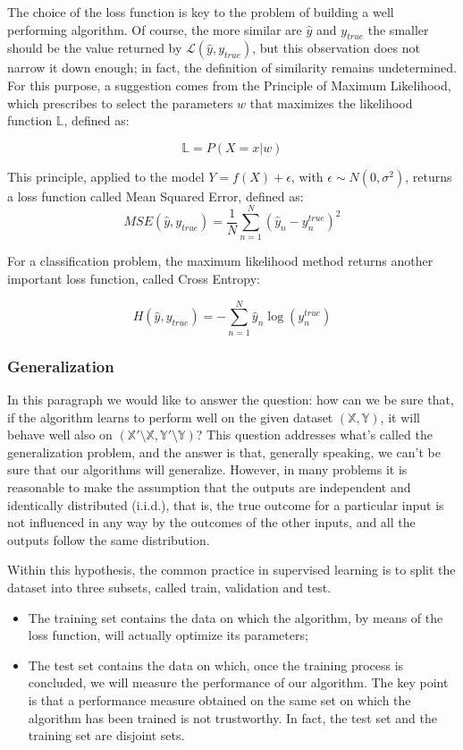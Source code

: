\documentclass[a4paper, twoside]{article}
\begin{document}
         The choice of the loss function is key to the problem of building a well performing algorithm. Of course, the more similar are $\hat{y}$ and $y_{true}$ the smaller should be the value returned by $\mathcal{L}(\hat{y}, y_{true})$, but this observation does not narrow it down enough; in fact, the definition of similarity remains undetermined. For this purpose, a suggestion comes from the Principle of Maximum Likelihood, which prescribes to select the parameters $w$ that maximizes the likelihood function $\mathbb{L}$, defined as:

         $$ \mathbb{L} = P(X=x | w)$$

         This principle, applied to the model $ Y = f(X) + \epsilon$, with $\epsilon \sim N(0, \sigma^2)$, returns a loss function called Mean Squared Error, defined as:
         $$ MSE(\hat{y}, y_{true}) = \frac{1}{N} \sum_{n=1}^{N} (\hat{y}_n - y^{true}_n)^{2}$$

         For a classification problem, the maximum likelihood method returns another important loss function, called Cross Entropy:

         $$ H(\hat{y}, y_{true}) = - \sum_{n=1}^{N} \hat{y}_n \log(y^{true}_n)$$

        \subsubsection{Generalization}

        In this paragraph we would like to answer the question: how can we be sure that, if the algorithm learns to perform well on the given dataset $(\mathbb{X}, \mathbb{Y})$, it will behave well also on $(\mathbb{X}'\setminus\mathbb{X},\mathbb{Y}'\setminus\mathbb{Y})$?
        This question addresses what's called the generalization problem, and the answer is that, generally speaking, we can't be sure that our algorithms will generalize. However, in many problems it is reasonable to make the assumption that the outputs are independent and identically distributed (i.i.d.), that is, the true outcome for a particular input is not influenced in any way by the outcomes of the other inputs, and all the outputs follow the same distribution.

        Within this hypothesis, the common practice in supervised learning is to split the dataset into three subsets, called train, validation and test.
        \begin{itemize}
            \item The training set contains the data on which the algorithm, by means of the loss function, will actually optimize its parameters;
            \item The test set contains the data on which, once the training process is concluded, we will measure the performance of our algorithm. The key point is that a performance measure obtained on the same set on which the algorithm has been trained is not trustworthy. In fact, the test set and the training set are disjoint sets.
        \end{itemize}
\end{document}
